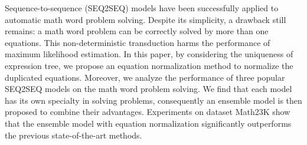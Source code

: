 Sequence-to-sequence (SEQ2SEQ) models have been successfully applied to automatic math word problem solving. Despite its simplicity, a drawback still remains: a math word problem can be correctly solved by more than one equations. This non-deterministic transduction harms the performance of maximum likelihood estimation. In this paper, by considering the uniqueness of expression tree, we propose an equation normalization method to normalize the duplicated equations. Moreover, we analyze the performance of three popular SEQ2SEQ models on the math word problem solving. We find that each model has its own specialty in solving problems, consequently an ensemble model is then proposed to combine their advantages. Experiments on dataset Math23K show that the ensemble model with equation normalization significantly outperforms the previous state-of-the-art methods.
